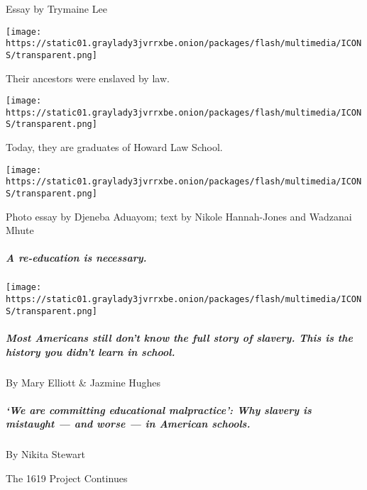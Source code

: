 Essay by Trymaine Lee

\href{https://www.nytimes3xbfgragh.onion/interactive/2019/08/14/magazine/howard-university-law-school.html}{}

\texttt{[image: https://static01.graylady3jvrrxbe.onion/packages/flash/multimedia/ICONS/transparent.png]}

Their ancestors were enslaved by law.

\texttt{[image: https://static01.graylady3jvrrxbe.onion/packages/flash/multimedia/ICONS/transparent.png]}

Today, they are graduates of Howard Law School.

\texttt{[image: https://static01.graylady3jvrrxbe.onion/packages/flash/multimedia/ICONS/transparent.png]}

Photo essay by Djeneba Aduayom; text by Nikole Hannah-Jones and Wadzanai
Mhute

\hypertarget{a-re-education-is-necessary}{%
\subparagraph{A re-education is
necessary.}\label{a-re-education-is-necessary}}

\texttt{[image: https://static01.graylady3jvrrxbe.onion/packages/flash/multimedia/ICONS/transparent.png]}

\href{https://www.nytimes3xbfgragh.onion/interactive/2019/08/19/magazine/history-slavery-smithsonian.html}{}

\hypertarget{most-americans-still-dont-know-the-full-story-of-slavery-this-is-the-history-you-didnt-learn-in-school}{%
\subparagraph{Most Americans still don't know the full story of slavery.
This is the history you didn't learn in
school.}\label{most-americans-still-dont-know-the-full-story-of-slavery-this-is-the-history-you-didnt-learn-in-school}}

By Mary Elliott \& Jazmine Hughes

\href{/interactive/2019/08/19/magazine/slavery-american-schools.html}{}

\hypertarget{we-are-committing-educational-malpractice-why-slavery-is-mistaught--and-worse--in-american-schools}{%
\subparagraph{`We are committing educational malpractice': Why slavery
is mistaught --- and worse --- in American
schools.}\label{we-are-committing-educational-malpractice-why-slavery-is-mistaught--and-worse--in-american-schools}}

By Nikita Stewart

The 1619 Project Continues

\href{https://www.nytimes3xbfgragh.onion/2019/08/23/podcasts/1619-slavery-anniversary.html}{}

